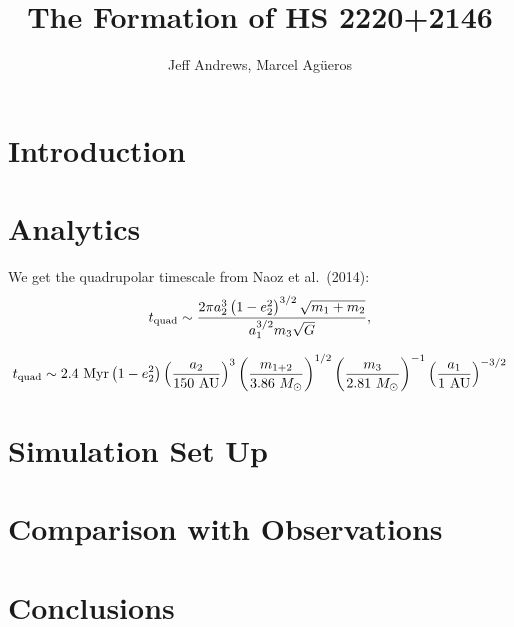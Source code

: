 \documentclass{emulateapj}
\newcommand{\Msun}{\ifmmode {M_{\odot}}\else${M_{\odot}}$\fi}
\begin{document}
\title{The Formation of HS 2220+2146}

\author{Jeff Andrews,  
Marcel Ag\"ueros
}


\begin{abstract}

\end{abstract}


\section{Introduction}





\section{Analytics}

We get the quadrupolar timescale from Naoz et al.\ (2014):
\begin{equation}
t_{\rm quad} \sim \frac{2 \pi a_2^3 \left( 1 - e_2^2 \right)^{3/2} \sqrt{m_1 + m_2} }{a_1^{3/2} m_3 \sqrt{G}},
\end{equation}


\begin{equation}
t_{\rm quad} \sim 2.4 ~{\rm Myr} \left( 1-e_2^2 \right) \left( \frac{a_2}{150 ~{\rm AU}} \right)^{3} \left( \frac{m_{1+2}}{3.86 ~\Msun} \right)^{1/2} \left( \frac{m_3}{2.81 ~\Msun} \right)^{-1} \left( \frac{a_1}{1 ~{\rm AU}} \right)^{-3/2}
\end{equation}



\section{Simulation Set Up}



\section{Comparison with Observations}



\section{Conclusions}



\acknowledgments


\clearpage
\setlength{\baselineskip}{0.6\baselineskip}

\setlength{\baselineskip}{1.667\baselineskip}
\end{document}
